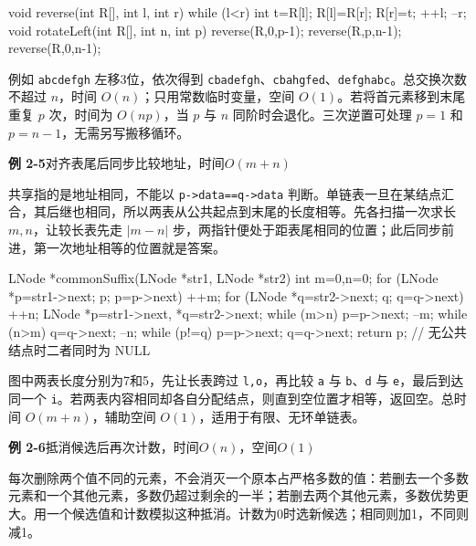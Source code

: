 \documentclass{sidenotes-simplex}
\begin{document}
\begin{codeblock}[language={}]
void reverse(int R[], int l, int r) {
    while (l<r) {
        int t=R[l]; R[l]=R[r]; R[r]=t;
        ++l; --r;
    }
}
void rotateLeft(int R[], int n, int p) {
    reverse(R,0,p-1);
    reverse(R,p,n-1);
    reverse(R,0,n-1);
}
\end{codeblock}

例如 \texttt{abcdefgh} 左移3位，依次得到 \texttt{cbadefgh}、\texttt{cbahgfed}、\texttt{defghabc}。总交换次数不超过 \(n\)，时间 \(O(n)\)；只用常数临时变量，空间 \(O(1)\)。若将首元素移到末尾重复 \(p\) 次，时间为 \(O(np)\)，当 \(p\) 与 \(n\) 同阶时会退化。三次逆置可处理 \(p=1\) 和 \(p=n-1\)，无需另写搬移循环。

\par\medskip\Needspace{30.00mm}\noindent{}\label{a:DS02-E05}\textbf{例 2-5}\quad 对齐表尾后同步比较地址，时间\(O(m+n)\)
\par\smallskip
共享指的是地址相同，不能以 \texttt{p-\textgreater{}data==q-\textgreater{}data} 判断。单链表一旦在某结点汇合，其后继也相同，所以两表从公共起点到末尾的长度相等。先各扫描一次求长 \(m,n\)，让较长表先走 \(|m-n|\) 步，两指针便处于距表尾相同的位置；此后同步前进，第一次地址相等的位置就是答案。

\begin{codeblock}[language={}]
LNode *commonSuffix(LNode *str1, LNode *str2) {
    int m=0,n=0;
    for (LNode *p=str1->next; p; p=p->next) ++m;
    for (LNode *q=str2->next; q; q=q->next) ++n;
    LNode *p=str1->next, *q=str2->next;
    while (m>n) { p=p->next; --m; }
    while (n>m) { q=q->next; --n; }
    while (p!=q) { p=p->next; q=q->next; }
    return p;                   // 无公共结点时二者同时为 NULL
}
\end{codeblock}

图中两表长度分别为7和5，先让长表跨过 \texttt{l,o}，再比较 \texttt{a} 与 \texttt{b}、\texttt{d} 与 \texttt{e}，最后到达同一个 \texttt{i}。若两表内容相同却各自分配结点，则直到空位置才相等，返回空。总时间 \(O(m+n)\)，辅助空间 \(O(1)\)，适用于有限、无环单链表。

\par\medskip\Needspace{30.00mm}\noindent{}\label{a:DS02-E06}\textbf{例 2-6}\quad 抵消候选后再次计数，时间\(O(n)\)，空间\(O(1)\)
\par\smallskip
每次删除两个值不同的元素，不会消灭一个原本占严格多数的值：若删去一个多数元素和一个其他元素，多数仍超过剩余的一半；若删去两个其他元素，多数优势更大。用一个候选值和计数模拟这种抵消。计数为0时选新候选；相同则加1，不同则减1。
\end{document}
